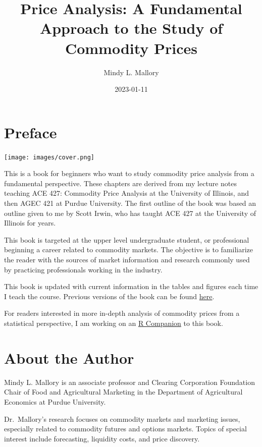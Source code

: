 \documentclass[
]{book}
\title{Price Analysis: A Fundamental Approach to the Study of Commodity Prices}
\author{Mindy L. Mallory}
\date{2023-01-11}
\begin{document}
\maketitle

{
\setcounter{tocdepth}{1}
\tableofcontents
}
\hypertarget{preface}{%
\chapter*{Preface}\label{preface}}

\texttt{[image: images/cover.png]}

This is a book for beginners who want to study commodity price analysis from a fundamental perspective. These chapters are derived from my lecture notes teaching ACE 427: Commodity Price Analysis at the University of Illinois, and then AGEC 421 at Purdue University. The first outline of the book was based an outline given to me by Scott Irwin, who has taught ACE 427 at the University of Illinois for years.

This book is targeted at the upper level undergraduate student, or professional beginning a career related to commodity markets. The objective is to familiarize the reader with the sources of market information and research commonly used by practicing professionals working in the industry.

This book is updated with current information in the tables and figures each time I teach the course. Previous versions of the book can be found \href{https://github.com/mindymallory/PriceAnalysis/releases}{here}.

For readers interested in more in-depth analysis of commodity prices from a statistical perspective, I am working on an \href{http://mindymallory.github.io/R-Companion-Price-Analysis/index.html}{R Companion} to this book.

\hypertarget{about-the-author}{%
\chapter*{About the Author}\label{about-the-author}}

Mindy L. Mallory is an associate professor and Clearing Corporation Foundation Chair of Food and Agricultural Marketing in the Department of Agricultural Economics at Purdue University.

Dr.~Mallory's research focuses on commodity markets and marketing issues, especially related to commodity futures and options markets. Topics of special interest include forecasting, liquidity costs, and price discovery.
\end{document}

